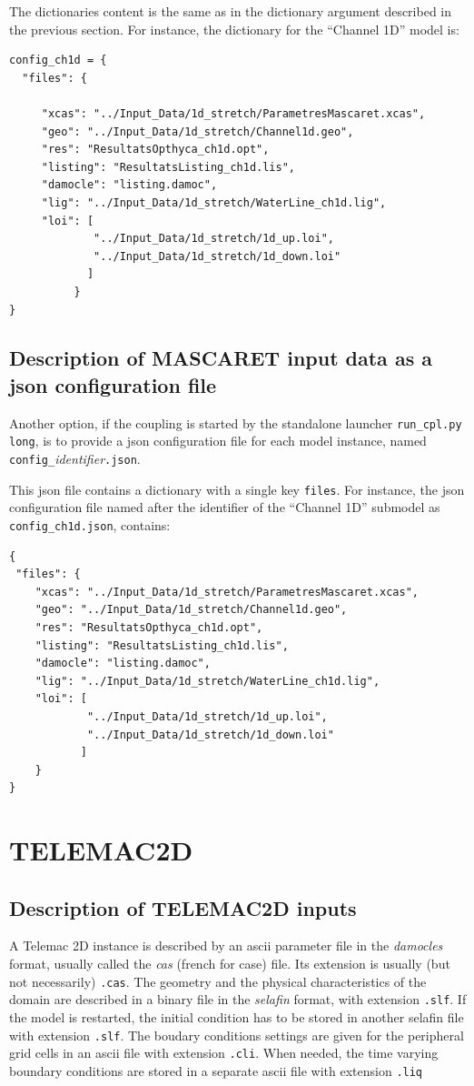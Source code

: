 The dictionaries content is the same as in the dictionary argument described in
the previous section. For instance, the dictionary for the ``Channel 1D'' model is:
\begin{verbatim}
config_ch1d = {
  "files": {

     "xcas": "../Input_Data/1d_stretch/ParametresMascaret.xcas",
     "geo": "../Input_Data/1d_stretch/Channel1d.geo",
     "res": "ResultatsOpthyca_ch1d.opt",
     "listing": "ResultatsListing_ch1d.lis",
     "damocle": "listing.damoc",
     "lig": "../Input_Data/1d_stretch/WaterLine_ch1d.lig",
     "loi": [
             "../Input_Data/1d_stretch/1d_up.loi",
             "../Input_Data/1d_stretch/1d_down.loi"
            ]
          }
}
\end{verbatim}

\subsection{Description of MASCARET input data as a json configuration file }
Another option, if the coupling is started by the standalone launcher
\texttt{run\_cpl.py long}, is to provide a json configuration file
for each model instance, named \\
\texttt{config\_}{\em identifier}\texttt{.json}.

This json file contains a dictionary with a single key \texttt{files}. For instance, the json configuration file named after the identifier of the ``Channel 1D'' submodel as \texttt{config\_ch1d.json}, contains:
\begin{verbatim}
{
 "files": {
    "xcas": "../Input_Data/1d_stretch/ParametresMascaret.xcas",
    "geo": "../Input_Data/1d_stretch/Channel1d.geo",
    "res": "ResultatsOpthyca_ch1d.opt",
    "listing": "ResultatsListing_ch1d.lis",
    "damocle": "listing.damoc",
    "lig": "../Input_Data/1d_stretch/WaterLine_ch1d.lig",
    "loi": [
            "../Input_Data/1d_stretch/1d_up.loi",
            "../Input_Data/1d_stretch/1d_down.loi"
           ]
    }
}
\end{verbatim}

\section{TELEMAC2D}\label{ftree:TELEMAC2D}
\subsection{Description of TELEMAC2D inputs}
A Telemac 2D instance is described by an ascii parameter file
in the {\em damocles} format, usually called the {\em cas} (french for
case) file. Its extension is usually (but not necessarily) \texttt{.cas}.
The geometry and the physical characteristics of the domain are
described in a binary file in the {\em selafin} format, with extension
\texttt{.slf}. If the model is restarted, the initial condition has
to be stored in another selafin file with extension \texttt{.slf}.
The boudary conditions settings are given for the
peripheral grid cells in an ascii file with extension
\texttt{.cli}. When needed, the time varying boundary conditions are stored in
a separate ascii file with extension \texttt{.liq}
\newline

